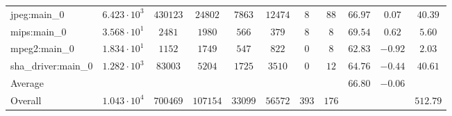 \begin{tabular}{|l|c|c|c|c|c|c|c|c|c|c|}
jpeg:main\_0            & $ 6.423 \cdot 10^{3} $ & $ 430123 $ & $ 24802  $ & $ 7863  $ & $ 12474 $ & $ 8   $ & $ 88  $ & $ 66.97       $ & $ 0.07    $ & $ 40.39   $ \\
mips:main\_0            & $ 3.568 \cdot 10^{1} $ & $ 2481   $ & $ 1980   $ & $ 566   $ & $ 379   $ & $ 8   $ & $ 8   $ & $ 69.54       $ & $ 0.62    $ & $ 5.60    $ \\
mpeg2:main\_0           & $ 1.834 \cdot 10^{1} $ & $ 1152   $ & $ 1749   $ & $ 547   $ & $ 822   $ & $ 0   $ & $ 8   $ & $ 62.83       $ & $ -0.92   $ & $ 2.03    $ \\
sha\_driver:main\_0     & $ 1.282 \cdot 10^{3} $ & $ 83003  $ & $ 5204   $ & $ 1725  $ & $ 3510  $ & $ 0   $ & $ 12  $ & $ 64.76       $ & $ -0.44   $ & $ 40.61   $ \\
\hline
Average                 & $                    $ & $        $ & $        $ & $       $ & $       $ & $     $ & $     $ & $ 66.80       $ & $ -0.06   $ & $         $ \\
\hline
Overall                 & $ 1.043 \cdot 10^{4} $ & $ 700469 $ & $ 107154 $ & $ 33099 $ & $ 56572 $ & $ 393 $ & $ 176 $ & $             $ & $         $ & $ 512.79  $ \\
\hline
\end{tabular}
